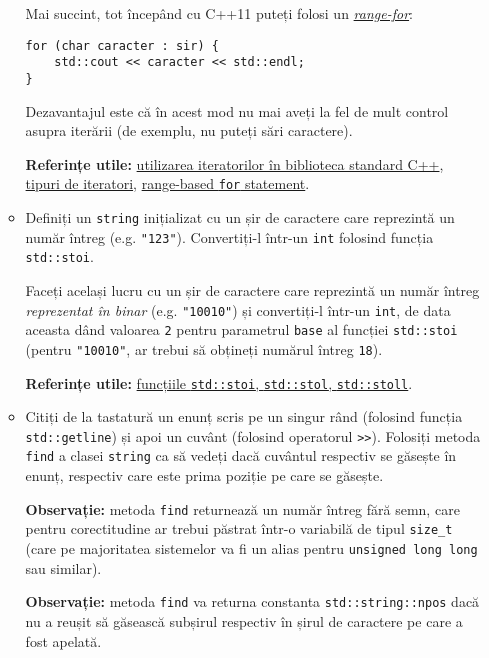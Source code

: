 \begin{enumerate}
\begin{itemize}
        Mai succint, tot începând cu C++11 puteți folosi un \href{https://learn.microsoft.com/en-us/cpp/cpp/range-based-for-statement-cpp?view=msvc-170}{\textit{range-for}}:
        \begin{lstlisting}
for (char caracter : sir) {
    std::cout << caracter << std::endl;
}
        \end{lstlisting}
        Dezavantajul este că în acest mod nu mai aveți la fel de mult control asupra iterării (de exemplu, nu puteți sări caractere).

        \textbf{Referințe utile:} \href{https://www.geeksforgeeks.org/iterators-c-stl/}{utilizarea iteratorilor în biblioteca standard C++}, \href{https://cplusplus.com/reference/iterator/}{tipuri de iteratori}, \href{https://learn.microsoft.com/en-us/cpp/cpp/range-based-for-statement-cpp?view=msvc-170}{range-based \texttt{for} statement}.

        \item Definiți un \texttt{string} inițializat cu un șir de caractere care reprezintă un număr întreg (e.g. \texttt{"123"}). Convertiți-l într-un \texttt{int} folosind funcția \texttt{std::stoi}.
        
        Faceți același lucru cu un șir de caractere care reprezintă un număr întreg \emph{reprezentat în binar} (e.g. \texttt{"10010"}) și convertiți-l într-un \texttt{int}, de data aceasta dând valoarea \texttt{2} pentru parametrul \texttt{base} al funcției \texttt{std::stoi} (pentru \texttt{"10010"}, ar trebui să obțineți numărul întreg \texttt{18}).

        \textbf{Referințe utile:} \href{https://en.cppreference.com/w/cpp/string/basic_string/stol}{funcțiile \texttt{std::stoi}, \texttt{std::stol}, \texttt{std::stoll}}.

        \item Citiți de la tastatură un enunț scris pe un singur rând (folosind funcția \texttt{std::getline}) și apoi un cuvânt (folosind operatorul \texttt{>>}). Folosiți metoda \texttt{find} a clasei \texttt{string} ca să vedeți dacă cuvântul respectiv se găsește în enunț, respectiv care este prima poziție pe care se găsește.

        \textbf{Observație:} metoda \texttt{find} returnează un număr întreg fără semn, care pentru corectitudine ar trebui păstrat într-o variabilă de tipul \texttt{size\_t} (care pe majoritatea sistemelor va fi un alias pentru \texttt{unsigned long long} sau similar).

        \textbf{Observație:} metoda \texttt{find} va returna constanta \texttt{std::string::npos} dacă nu a reușit să găsească subșirul respectiv în șirul de caractere pe care a fost apelată.


\end{itemize}
\end{enumerate}
